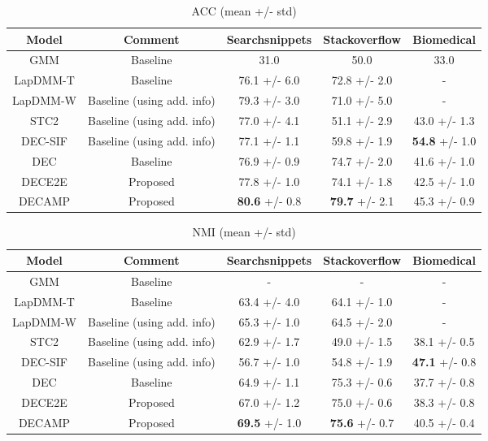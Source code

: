 \documentclass[letterpaper]{article}
\begin{document}
\begin{table*}[t]
\centering
  \begin{tabular}{ | c | c | c | c | c |}
    \hline
    \textbf{Model} & \textbf{Comment} & \textbf{Searchsnippets} & \textbf{Stackoverflow} & \textbf{Biomedical} \\ \hline
    GMM & Baseline  & 31.0 & 50.0 & 33.0 \\ \hline
    LapDMM-T & Baseline & 76.1 +\!/\!- 6.0 & 72.8 +\!/\!-  2.0 & - \\ \hline
    LapDMM-W & Baseline (using add. info) & 79.3 +\!/\!- 3.0 & 71.0 +\!/\!- 5.0 & - \\ \hline
    STC2 & Baseline (using add. info) & 77.0 +\!/\!- 4.1 & 51.1 +\!/\!- 2.9 & 43.0 +\!/\!- 1.3 \\ \hline
    DEC-SIF & Baseline (using add. info) & 77.1 +\!/\!- 1.1 & 59.8 +\!/\!- 1.9 & \textbf{54.8} +\!/\!- 1.0 \\ \hline
    DEC & Baseline & 76.9 +\!/\!- 0.9 & 74.7 +\!/\!- 2.0 & 41.6 +\!/\!- 1.0 \\ \hline
    DECE2E & Proposed & 77.8 +\!/\!- 1.0 & 74.1 +\!/\!- 1.8 & 42.5 +\!/\!- 1.0 \\ \hline
    DECAMP & Proposed & \textbf{80.6} +\!/\!- 0.8 & \textbf{79.7} +\!/\!- 2.1 & 45.3 +\!/\!- 0.9 \\ \hline
    \hline
\end{tabular}
    \caption{ACC (mean +/- std)}
   \label{acc}
\end{table*}

\begin{table*}[t]
\centering
  \begin{tabular}{ | c | c | c | c | c |}
    \hline
    \textbf{Model} & \textbf{Comment} & \textbf{Searchsnippets} & \textbf{Stackoverflow} & \textbf{Biomedical} \\ \hline
    GMM & Baseline  & - & - & - \\ \hline
    LapDMM-T & Baseline & 63.4 +\!/\!- 4.0 & 64.1 +\!/\!-  1.0 & - \\ \hline
    LapDMM-W & Baseline (using add. info) & 65.3 +\!/\!- 1.0 & 64.5 +\!/\!- 2.0 & - \\ \hline
    STC2 & Baseline (using add. info) & 62.9 +\!/\!- 1.7 & 49.0 +\!/\!- 1.5 & 38.1 +\!/\!- 0.5 \\ \hline
    DEC-SIF & Baseline (using add. info) & 56.7 +\!/\!- 1.0 & 54.8 +\!/\!- 1.9 & \textbf{47.1} +\!/\!- 0.8 \\ \hline
    DEC & Baseline & 64.9 +\!/\!- 1.1 & 75.3 +\!/\!- 0.6 & 37.7 +\!/\!- 0.8 \\ \hline
    DECE2E & Proposed & 67.0 +\!/\!- 1.2 & 75.0 +\!/\!- 0.6 & 38.3 +\!/\!- 0.8 \\ \hline
    DECAMP & Proposed & \textbf{69.5} +\!/\!- 1.0 & \textbf{75.6} +\!/\!- 0.7 & 40.5 +\!/\!- 0.4 \\ \hline
    \hline
\end{tabular}
    \caption{NMI (mean +/- std)}
   \label{nmi}
\end{table*}
\end{document}
